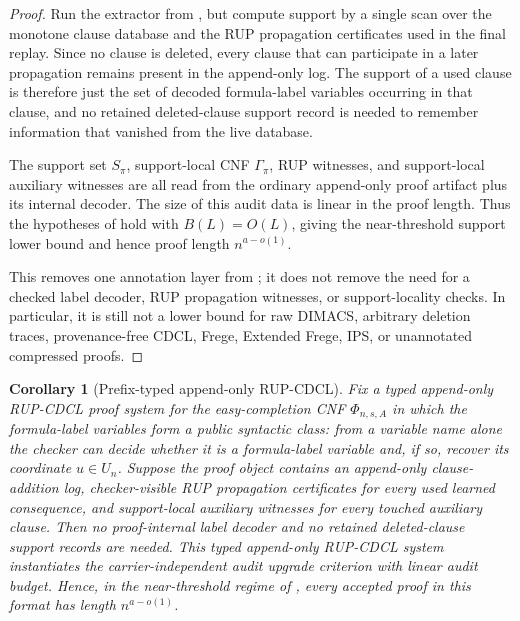 \documentclass[11pt]{article}
\newtheorem{corollary}[theorem]{Corollary}
\theoremstyle{definition}
\begin{document}
\begin{proof}
Run the extractor from , but compute support by
a single scan over the monotone clause database and the RUP propagation
certificates used in the final replay.  Since no clause is deleted, every clause
that can participate in a later propagation remains present in the append-only
log.  The support of a used clause is therefore just the set of decoded
formula-label variables occurring in that clause, and no retained
deleted-clause support record is needed to remember information that vanished
from the live database.

The support set \(S_\pi\), support-local CNF \(\Gamma_\pi\), RUP witnesses, and
support-local auxiliary witnesses are all read from the ordinary append-only
proof artifact plus its internal decoder.  The size of this audit data is linear
in the proof length.  Thus the hypotheses of
 hold with \(B(L)=O(L)\), giving the
near-threshold support lower bound and hence proof length \(n^{a-o(1)}\).

This removes one annotation layer from
; it does not remove the need for a checked
label decoder, RUP propagation witnesses, or support-locality checks.  In
particular, it is still not a lower bound for raw DIMACS, arbitrary deletion
traces, provenance-free CDCL, Frege, Extended Frege, IPS, or unannotated
compressed proofs.
\end{proof}

\begin{corollary}[Prefix-typed append-only RUP-CDCL]\label{cor:prefix-typed-append-only-rup-cdcl}
Fix a typed append-only RUP-CDCL proof system for the easy-completion CNF
\(\Phi_{n,s,A}\) in which the formula-label variables form a public syntactic
class: from a variable name alone the checker can decide whether it is a
formula-label variable and, if so, recover its coordinate \(u\in U_n\).  Suppose
the proof object contains an append-only clause-addition log, checker-visible
RUP propagation certificates for every used learned consequence, and
support-local auxiliary witnesses for every touched auxiliary clause.  Then no
proof-internal label decoder and no retained deleted-clause support records are
needed.  This typed append-only RUP-CDCL system instantiates the
carrier-independent audit upgrade criterion with linear audit budget.  Hence,
in the near-threshold regime of , every accepted
proof in this format has length \(n^{a-o(1)}\).
\end{corollary}
\end{document}
